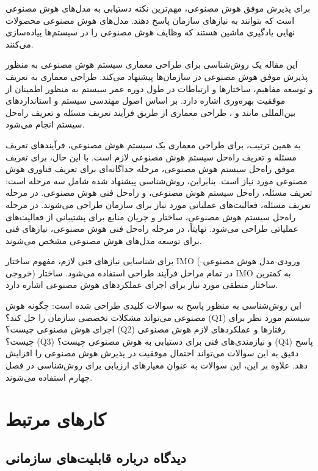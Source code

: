\documentclass[a4paper,10pt]{article}
\begin{document}
        برای پذیرش موفق هوش مصنوعی، مهم‌ترین نکته دستیابی به مدل‌های هوش مصنوعی است که بتوانند به نیازهای سازمان پاسخ دهند. مدل‌های هوش مصنوعی محصولات نهایی یادگیری ماشین هستند که وظایف هوش مصنوعی را در سیستم‌ها پیاده‌سازی می‌کنند.

        این مقاله یک روش‌شناسی برای طراحی معماری سیستم هوش مصنوعی به منظور پذیرش موفق هوش مصنوعی در سازمان‌ها پیشنهاد می‌کند. طراحی معماری به تعریف و توسعه مفاهیم، ساختارها و ارتباطات در طول دوره عمر سیستم به منظور اطمینان از موفقیت بهره‌وری اشاره دارد. بر اساس اصول مهندسی سیستم و استانداردهای بین‌المللی مانند  و ، طراحی معماری از طریق فرآیند تعریف مسئله و تعریف راه‌حل سیستم انجام می‌شود.

        به همین ترتیب، برای طراحی معماری یک سیستم هوش مصنوعی، فرآیندهای تعریف مسئله و تعریف راه‌حل سیستم هوش مصنوعی لازم است. با این حال، برای تعریف موفق راه‌حل سیستم هوش مصنوعی، مرحله جداگانه‌ای برای تعریف فناوری هوش مصنوعی مورد نیاز است. بنابراین، روش‌شناسی پیشنهاد شده شامل سه مرحله است: تعریف مسئله، راه‌حل سیستم هوش مصنوعی، و راه‌حل فنی هوش مصنوعی. در مرحله تعریف مسئله، فعالیت‌های عملیاتی مورد نیاز برای سازمان طراحی می‌شوند. در مرحله راه‌حل سیستم هوش مصنوعی، ساختار و جریان منابع برای پشتیبانی از فعالیت‌های عملیاتی طراحی می‌شود. نهایتاً، در مرحله راه‌حل فنی هوش مصنوعی، نیازهای فنی برای توسعه مدل‌های هوش مصنوعی مشخص می‌شوند.

        برای شناسایی نیازهای فنی لازم، مفهوم ساختار IMO (ورودی-مدل هوش مصنوعی-خروجی) در تمام مراحل فرآیند طراحی استفاده می‌شود. ساختار IMO به کمترین ساختار منطقی مورد نیاز برای اجرای عملکردهای هوش مصنوعی اشاره دارد.

        این روش‌شناسی به منظور پاسخ به سوالات کلیدی طراحی شده است: چگونه هوش مصنوعی می‌تواند مشکلات تخصصی سازمان را حل کند؟ (Q1) سیستم مورد نظر برای اجرای هوش مصنوعی چیست؟ (Q2) رفتارها و عملکردهای لازم هوش مصنوعی چیست؟ (Q3) و نیازمندی‌های فنی برای دستیابی به هوش مصنوعی چیست؟ (Q4) پاسخ دقیق به این سوالات می‌تواند احتمال موفقیت در پذیرش هوش مصنوعی را افزایش دهد. علاوه بر این، این سوالات به عنوان معیارهای ارزیابی برای روش‌شناسی در فصل چهارم استفاده می‌شوند.

    \section{کارهای مرتبط}

        \subsection{دیدگاه درباره قابلیت‌های سازمانی}
\end{document}
